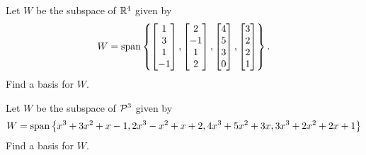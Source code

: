 \begin{activity}{10}
Let \(W\) be the subspace of \(\IR^4\) given by
 \[W = \vspan \left\{
 \begin{bmatrix} 1 \\ 3 \\ 1 \\ -1 \end{bmatrix},
 \begin{bmatrix} 2 \\ -1 \\ 1 \\ 2 \end{bmatrix},
 \begin{bmatrix} 4 \\ 5 \\ 3 \\ 0 \end{bmatrix},
 \begin{bmatrix} 3 \\ 2 \\ 2 \\ 1 \end{bmatrix}
 \right\}. \]
 Find a basis for \(W\).
\end{activity}

\begin{activity}{10}
Let \(W\) be the subspace of \(\P^3\) given by
 \[W = \vspan \left\{x^3+3x^2+x-1, 2x^3-x^2+x+2, 4x^3+5x^2+3x, 3x^3+2x^2+2x+1 \right\} \]
 Find a basis for \(W\).
\end{activity}

